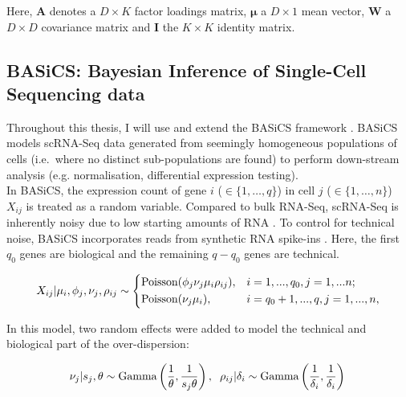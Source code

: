 Here, $\bm{A}$ denotes a $D\times{}K$ factor loadings matrix, $\bm{\mu}$ a $D\times{}1$ mean vector, $\bm{W}$ a $D\times{}D$ covariance matrix and $\bm{I}$ the $K\times{}K$ identity matrix.

\subsection{BASiCS: Bayesian Inference of Single-Cell Sequencing data} 
\label{sec0:BASiCS}

Throughout this thesis, I will use and extend the \gls{BASiCS} framework \citep{Vallejos2015BASiCS, Vallejos2016}. 
BASiCS models scRNA-Seq data generated from seemingly homogeneous populations of cells (i.e.~where no distinct sub-populations are found) to perform down-stream analysis (e.g. normalisation, differential expression testing).\\

In BASiCS, the expression count of gene $i$ ($ \in \{1, \ldots, q\}$) in cell $j$ ($\in \{ 1, \ldots ,n\}$) $X_{ij}$ is treated as a random variable. 
Compared to bulk RNA-Seq, scRNA-Seq is inherently noisy due to low starting amounts of RNA \citep{Brennecke2013}. 
To control for technical noise, BASiCS incorporates reads from synthetic RNA spike-ins \citep{Jiang2011}. 
Here, the first $q_0$ genes are biological and the  remaining $q-q_0$ genes are technical.

\begin{equation} 
 X_{ij}|\mu_i,\phi_j,\nu_j,\rho_{ij} \sim
 \left\lbrace
  \begin{aligned}
    &\textnormal{Poisson}(\phi_j\nu_j\mu_i\rho_{ij}), && i=1,...,q_0,j=1,...n;  \\ 
    &\textnormal{Poisson}(\nu_j\mu_i), && i=q_0+1,...,q,j=1,...,n,    	    
  \end{aligned}
\right.
\end{equation} 

In this model, two random effects were added to model the technical and biological part of the over-dispersion:

\begin{equation} 
\nu_j|s_j,\theta \sim \textnormal{Gamma}\left(\frac{1}{\theta},\frac{1}{s_j\theta}\right), \hspace{0.2cm} \rho_{ij}|\delta_i  \sim \textnormal{Gamma}\left(\frac{1}{\delta_i},\frac{1}{\delta_i}\right)\\
\end{equation} 


